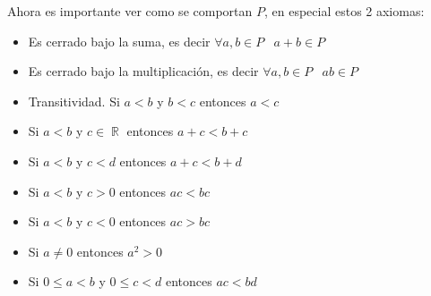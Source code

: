 \documentclass[12pt, fleqn]{report}                             %
\DeclareMathOperator \Space     {\quad}                         %
\DeclareMathOperator \MiniSpace {\;}                            %
\theoremstyle{break}                                            %
\DeclareMathOperator \Reals        {\mathbb{R}}                 %
\begin{document}
            Ahora es importante ver como se comportan $P$, en especial estos 2 axiomas:
            \begin{itemize}
                \item Es cerrado bajo la suma, es decir $\forall a, b \in P \MiniSpace a + b \in P$
                \item Es cerrado bajo la multiplicación, es decir $\forall a, b \in P \MiniSpace ab \in P$
            \end{itemize}


            \begin{itemize}
                \item Transitividad. Si $a < b$ y $b < c$ entonces $a < c$
                \item Si $a < b$ y $c \in \Reals$ entonces $a+c < b+c$
                \item Si $a < b$ y $c < d$ entonces $a+c < b+d$
                \item Si $a < b$ y $c > 0$ entonces $ac < bc$
                \item Si $a < b$ y $c < 0$ entonces $ac > bc$
                \item Si $a \neq 0$ entonces $a^2 > 0$
                \item Si $0 \leq a < b$ y $0 \leq c < d$ entonces $ac < bd$
            \end{itemize}
        
\end{document}
